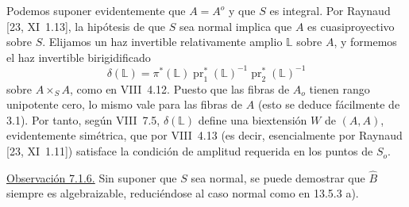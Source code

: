 Podemos suponer evidentemente que $A=A^o$ y que $S$ es integral. Por
Raynaud [23, XI~1.13], la hipótesis de que $S$ sea normal implica que
$A$ es cuasiproyectivo sobre $S$. Elijamos un haz invertible
relativamente amplio $\mathbb L$ sobre $A$, y formemos el haz invertible
birigidificado
\[
 \delta(\mathbb L)=
 \pi^*(\mathbb L)\operatorname{pr}_1^*(\mathbb L)^{-1}
 \operatorname{pr}_2^*(\mathbb L)^{-1}
\]
sobre $A\times_S A$, como en VIII~4.12. Puesto que las fibras de $A_o$
tienen rango unipotente cero, lo mismo vale para las fibras de $A$ (esto
se deduce fácilmente de 3.1). Por tanto, según VIII~7.5,
$\delta(\mathbb L)$ define una biextensión $W$ de $(A,A)$, evidentemente
simétrica, que por VIII~4.13 (es decir, esencialmente por Raynaud
[23, XI~1.11]) satisface la condición de amplitud requerida en los
puntos de $S_o$.

\medskip
\noindent
\underline{Observación 7.1.6.} Sin suponer que $S$ sea normal, se puede
demostrar que $\widehat B$ siempre es algebraizable, reduciéndose al
caso normal como en 13.5.3 a).
